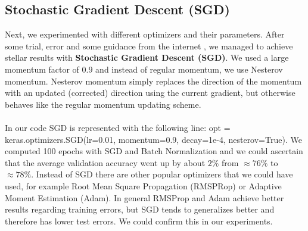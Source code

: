 \documentclass{article}
\begin{document}
	
	\subsection{Stochastic Gradient Descent (SGD)}
	\label{subsec:StochasticGradientDescent}
	Next, we experimented with different optimizers and their parameters. After some trial, error and some guidance from the internet \cite{Ruder2016SGD}, we managed to achieve stellar results with \textbf{Stochastic Gradient Descent (SGD)}. We used a large momentum factor of $0.9$ and instead of regular momentum, we use Nesterov momentum. Nesterov momentum simply replaces the direction of the momentum with an updated (corrected) direction using the current gradient, but otherwise behaves like the regular momentum updating scheme.\\
	\\
	In our code SGD is represented with the following line: opt = keras.optimizers.SGD(lr=0.01, momentum=0.9, decay=1e-4, nesterov=True). We computed 100 epochs with SGD and Batch Normalization and we could ascertain that the average validation accuracy went up by about $2\%$ from $\approx 76\%$ to $\approx 78\%$. Instead of SGD there are other popular optimizers that we could have used, for example Root Mean Square Propagation (RMSPRop) or Adaptive Moment Estimation (Adam). In general RMSProp and Adam achieve better results regarding training errors, but SGD tends to generalizes better and therefore has lower test errors. We could confirm this in our experiments.
	
\end{document}
